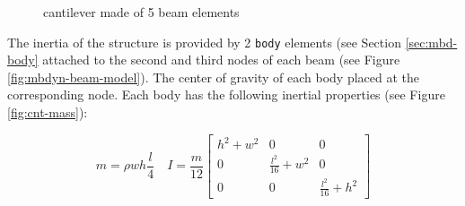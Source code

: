 \begin{figure}[htbp!]
	    \centering
    	\caption{cantilever made of 5 beam elements}
		\label{fig:cnt-beams}
\end{figure}

The inertia of the structure is provided by 2 \texttt{body} elements (see Section \ref{sec:mbd-body} attached to the second and third nodes of each beam (see Figure \ref{fig:mbdyn-beam-model}). The center of gravity of each body placed at the corresponding node. Each body has the following inertial properties (see Figure \ref{fig:cnt-mass}): 

\begin{equation}
    m = \rho wh \frac{l}{4} \quad I = \frac{m}{12} \begin{bmatrix} h^2+w^2 & 0 & 0 \\ 0 & \frac{l^2}{16} + w^2 & 0 \\ 0 & 0 & \frac{l^2}{16} + h^2 \end{bmatrix}
    \label{eq:body-inertia}
\end{equation}


